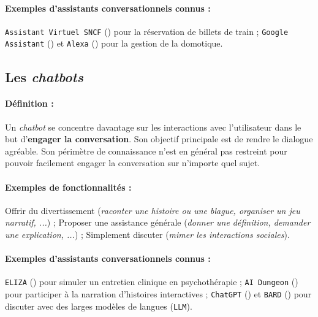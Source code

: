 			\paragraph{Exemples d'assistants conversationnels connus :}
				
				\texttt{Assistant Virtuel SNCF} (\cite{sncf:2018:agent-virtuel-sncf}) pour la réservation de billets de train ;
				\texttt{Google Assistant} (\cite{google:2016:google-assistant-your}) et \texttt{Alexa} (\cite{alexa-internet:2018:keyword-research-competitor}) pour la gestion de la domotique.
		
		
		\subsection{Les \textit{chatbots} }
		\label{annex:B.1.2-CHATBOT-CLASSIFICATION-CHAT-ORIENTED}
		
			\paragraph{Définition :}
				
				Un \textit{chatbot}  se concentre davantage sur les interactions avec l'utilisateur dans le but d'\textbf{engager la conversation}.
				Son objectif principale est de rendre le dialogue agréable.
				Son périmètre de connaissance n'est en général pas restreint pour pouvoir facilement engager la conversation sur n'importe quel sujet.
		
			\paragraph{Exemples de fonctionnalités :}
				
				Offrir du divertissement (\textit{raconter une histoire ou une blague, organiser un jeu narratif, ...}) ;
				Proposer une assistance générale (\textit{donner une définition, demander une explication, ...}) ;
				Simplement discuter (\textit{mimer les interactions sociales}).
			
			\paragraph{Exemples d'assistants conversationnels connus :}
				\texttt{ELIZA} (\cite{weizenbaum:1966:eliza-computer-program}) pour simuler un entretien clinique en psychothérapie ;
				\texttt{AI Dungeon} (\cite{latitude-inc.-oasis-tech-inc.:2019:ai-dungeon}) pour participer à la narration d'histoires interactives ;
				\texttt{ChatGPT} (\cite{openai:2023:chatgpt}) et \texttt{BARD} (\cite{google:2023:bard-chat-based}) pour discuter avec des larges modèles de langues (\texttt{LLM}).
	
